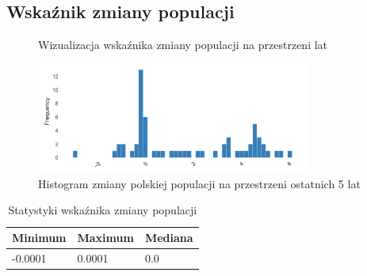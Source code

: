 \documentclass[11pt]{article}
\begin{document}
\subsection*{Wskaźnik zmiany populacji}
\begin{figure}[H]
        \centering
        \caption{Wizualizacja wskaźnika zmiany populacji na przestrzeni lat}
\end{figure}
\begin{figure}[H]
        \centering
        \includegraphics[width=0.8\textwidth]{images/histogram_zmiana_populacji.png}
        \caption{Histogram zmiany polskiej populacji na przestrzeni ostatnich 5 lat}
\end{figure}
\begin{table}[H]
        \centering
        \begin{tabular}{|l|l|l|}
        \hline
        Minimum & Maximum & Mediana \\ \hline
        -0.0001 & 0.0001 & 0.0 \\ \hline
        \end{tabular}
        \caption{Statystyki wskaźnika zmiany populacji}
        \end{table}


\end{document}
